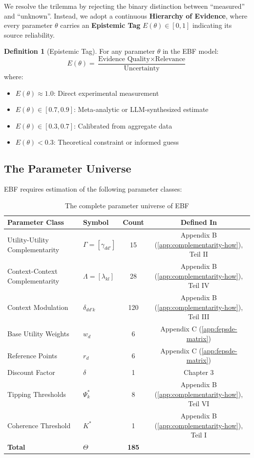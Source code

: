 \documentclass[11pt,a4paper]{article}
\theoremstyle{definition}
\newtheorem{definition}{Definition}[section]
\begin{document}
We resolve the trilemma by rejecting the binary distinction between ``measured'' 
and ``unknown''. Instead, we adopt a continuous \textbf{Hierarchy of Evidence}, 
where every parameter $\theta$ carries an \textbf{Epistemic Tag} $E(\theta) \in [0, 1]$ 
indicating its source reliability.

\begin{definition}[Epistemic Tag]
\label{def:epistemic-tag}
For any parameter $\theta$ in the EBF model:
\begin{equation}
E(\theta) = \frac{\text{Evidence Quality} \times \text{Relevance}}{\text{Uncertainty}}
\end{equation}
where:
\begin{itemize}
    \item $E(\theta) \approx 1.0$: Direct experimental measurement
    \item $E(\theta) \in [0.7, 0.9]$: Meta-analytic or LLM-synthesized estimate
    \item $E(\theta) \in [0.3, 0.7]$: Calibrated from aggregate data
    \item $E(\theta) < 0.3$: Theoretical constraint or informed guess
\end{itemize}
\end{definition}

\subsection{The Parameter Universe}

EBF requires estimation of the following parameter classes:

\begin{table}[h]
\centering
\begin{tabular}{llcc}
\toprule
\textbf{Parameter Class} & \textbf{Symbol} & \textbf{Count} & \textbf{Defined In} \\
\midrule
Utility-Utility Complementarity & $\Gamma = [\gamma_{dd'}]$ & 15 & Appendix B (\ref{app:complementarity-how}), Teil II \\
Context-Context Complementarity & $\Lambda = [\lambda_{kl}]$ & 28 & Appendix B (\ref{app:complementarity-how}), Teil IV \\
Context Modulation & $\delta_{dd'k}$ & 120 & Appendix B (\ref{app:complementarity-how}), Teil III \\
Base Utility Weights & $w_d$ & 6 & Appendix C (\ref{app:fepsde-matrix}) \\
Reference Points & $r_d$ & 6 & Appendix C (\ref{app:fepsde-matrix}) \\
Discount Factor & $\delta$ & 1 & Chapter 3 \\
Tipping Thresholds & $\Psi^*_k$ & 8 & Appendix B (\ref{app:complementarity-how}), Teil VI \\
Coherence Threshold & $K^*$ & 1 & Appendix B (\ref{app:complementarity-how}), Teil I \\
\midrule
\textbf{Total} & $\Theta$ & \textbf{185} & \\
\bottomrule
\end{tabular}
\caption{The complete parameter universe of EBF}
\label{tab:parameter-universe}
\end{table}
\end{document}
